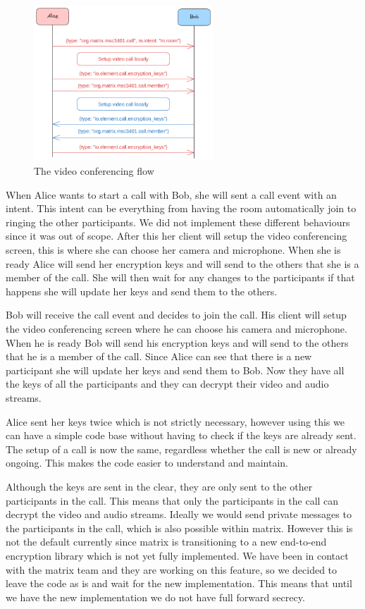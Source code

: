 \documentclass{report}
\begin{document}
\begin{figure}
\centering
\includegraphics[width=0.6\textwidth]{img/Callflow.excalidraw.png}
\caption{The video conferencing flow}
\label{fig:video-conference-flow}
\end{figure}

When Alice wants to start a call with Bob, she will sent a call event with an intent. This intent can be
everything from having the room automatically join to ringing the other participants. We did not implement
these different behaviours since it was out of scope. After this her client will setup the video conferencing
screen, this is where she can choose her camera and microphone. When she is ready Alice will send her encryption
keys and will send to the others that she is a member of the call. She will then wait for any changes to the
participants
if that happens she will update her keys and send them to the others.

Bob will receive the call event and decides to join the call. His client will setup the video conferencing
screen where he can choose his camera and microphone. When he is ready Bob will send his encryption keys and will
send to the others that he is a member of the call. Since Alice can see that there is a new participant she will
update her keys and send them to Bob. Now they have all the keys of all the participants and they can decrypt their
video and audio streams.

Alice sent her keys twice which is not strictly necessary, however using this we can have a simple code base
without having to check if the keys are already sent. The setup of a call is now the same, regardless whether
the call is new or already ongoing. This makes the code easier to understand and maintain.

Although the keys are sent in the clear, they are only sent to the other participants in the call. This means that
only the participants in the call can decrypt the video and audio streams. Ideally we would send private
messages to the participants in the call, which is also possible within matrix. However this is not the default
currently since matrix is transitioning to a new end-to-end encryption library which is not yet fully implemented.
We have been in contact with the matrix team and they are working on this feature, so we decided to leave the code
as is and wait for the new implementation. This means that until we have the new implementation we do not have
full forward secrecy.
\end{document}
